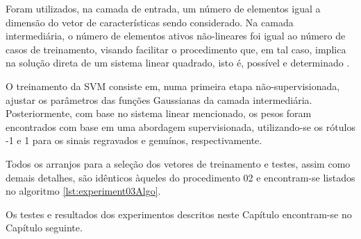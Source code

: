 		\par Foram utilizados, na camada de entrada, um número de elementos igual a dimensão do vetor de características sendo considerado. Na camada intermediária, o número de elementos ativos não-lineares foi igual ao número de casos de treinamento, visando facilitar o procedimento que, em tal caso, implica na solução direta de um sistema linear quadrado, isto é, possível e determinado \cite{poole2014linear}. 
		
		\par O treinamento da SVM consiste em, numa primeira etapa não-supervisionada, ajustar os parâmetros das funções Gaussianas da camada intermediária. Posteriormente, com base no sistema linear mencionado, os pesos foram encontrados com base em uma abordagem supervisionada, utilizando-se os rótulos -1 e 1 para os sinais regravados e genuínos, respectivamente.    
		
		\par Todos os arranjos para a seleção dos vetores de treinamento e testes, assim como demais detalhes,   são idênticos àqueles do procedimento 02 e encontram-se listados no algoritmo \ref{lst:experiment03Algo}. 
		
		

        \par Os testes e resultados dos experimentos descritos neste Capítulo encontram-se no Capítulo seguinte.
